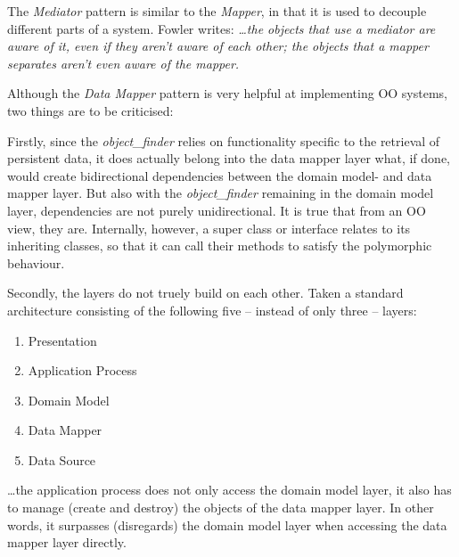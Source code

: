 The \emph{Mediator} pattern \cite{gamma1995} is similar to the \emph{Mapper}, in
that it is used to decouple different parts of a system. Fowler \cite{fowler2002}
writes: \textit{\ldots the objects that use a mediator are aware of it, even if
they aren't aware of each other; the objects that a mapper separates aren't even
aware of the mapper.}

Although the \emph{Data Mapper} pattern is very helpful at implementing OO
systems, two things are to be criticised:

Firstly, since the \emph{object\_finder} relies on functionality specific to the
retrieval of persistent data, it does actually belong into the data mapper layer
what, if done, would create bidirectional dependencies between the domain model-
and data mapper layer. But also with the \emph{object\_finder} remaining in the
domain model layer, dependencies are not purely unidirectional. It is true that
from an OO view, they are. Internally, however, a super class or interface
relates to its inheriting classes, so that it can call their methods to satisfy
the polymorphic behaviour.

Secondly, the layers do not truely build on each other. Taken a standard
architecture consisting of the following five -- instead of only three -- layers:

\begin{enumerate}
    \item Presentation
    \item Application Process
    \item Domain Model
    \item Data Mapper
    \item Data Source
\end{enumerate}

\ldots the application process does not only access the domain model layer, it
also has to manage (create and destroy) the objects of the data mapper layer.
In other words, it surpasses (disregards) the domain model layer when accessing
the data mapper layer directly.
